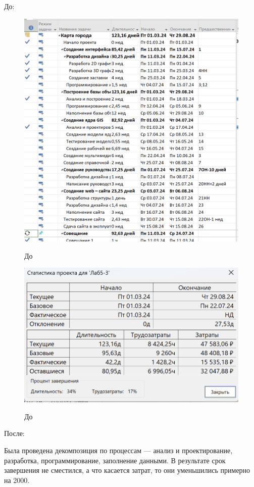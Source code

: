 До:

\begin{figure}[ht!]
	\includegraphics[width=0.75\linewidth]{assets/images/Screenshot 2024-03-16 at 13.16.44.png}
	\label{fig:r2}
	\caption{До}
\end{figure}
\FloatBarrier

\begin{figure}[ht!]
	\includegraphics[width=0.75\linewidth]{assets/images/Screenshot 2024-03-16 at 13.17.33.png}
	\label{fig:r2}
	\caption{До}
\end{figure}

После:

Была проведена декомпозиция по процессам –-- анализ и проектирование,
разработка, программирование, заполнение данными.
В результате срок завершения не сместился, а что касается затрат, то они уменьшились примерно на 2000.

